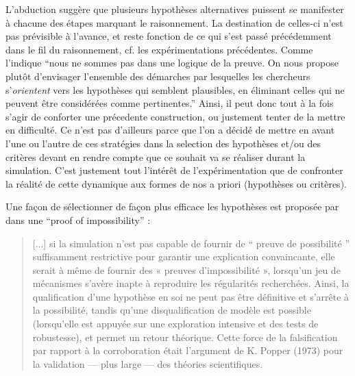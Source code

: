 


L'abduction suggère que plusieurs hypothèses alternatives puissent se manifester à chacune des étapes marquant le raisonnement. La destination de celles-ci n'est pas prévisible à l'avance, et reste fonction de ce qui s'est passé précédemment dans le fil du raisonnement, cf. les expérimentations précédentes. Comme l'indique \textcite{Besse2000} \enquote{nous ne sommes pas dans une logique de la preuve. On nous propose plutôt d'envisager l'ensemble des démarches par lesquelles les chercheurs s'\textit{orientent} vers les hypothèses qui semblent plausibles, en éliminant celles qui ne peuvent être considérées comme pertinentes.} Ainsi, il peut donc tout à la fois s'agir de conforter une précedente construction, ou justement tenter de la mettre en difficulté. Ce n'est pas d'ailleurs parce que l'on a décidé de mettre en avant l'une ou l'autre de ces stratégies dans la selection des hypothèses et/ou des critères devant en rendre compte que ce souhait va se réaliser durant la simulation. C'est justement tout l'intérêt de l'expérimentation que de confronter la réalité de cette dynamique aux formes de nos a priori (hypothèses ou critères).

Une façon de sélectionner de façon plus efficace les hypothèses est proposée par \textcite[300]{Cottineau2014b} dans une \foreignquote{english}{proof of impossibility} :

\blockquote[{\cite[300]{Cottineau2014b}}]{[...] si la simulation n’est pas capable de fournir de \enquote{ preuve de possibilité } suffisamment restrictive pour garantir une explication convaincante, elle serait à même de fournir des « preuves d’impossibilité », lorsqu’un jeu de mécanismes s’avère inapte à reproduire les régularités recherchées. Ainsi, la qualification d’une hypothèse en soi ne peut pas être définitive et s’arrête à la possibilité, tandis qu’une disqualification de modèle est possible (lorsqu’elle est appuyée sur une exploration intensive et des tests de robustesse), et permet un retour théorique. Cette force de la falsification par rapport à la corroboration était l’argument de K. Popper (1973) pour la validation — plus large — des théories scientifiques.}

